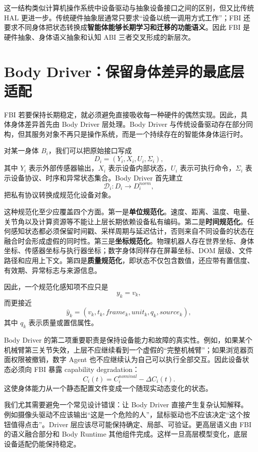 这一结构类似计算机操作系统中设备驱动与抽象设备接口之间的区别，但又比传统 HAL 更进一步。传统硬件抽象层通常只要求“设备以统一调用方式工作”；FBI 还要求不同身体把状态转换成\textbf{智能体能够长期学习和迁移的功能语义}。因此 FBI 是硬件抽象、身体语义抽象和认知 ABI 三者交叉形成的新层次。


\section{Body Driver：保留身体差异的最底层适配}

FBI 若要保持长期稳定，就必须避免直接吸收每一种硬件的偶然实现。因此，具体身体差异首先由 Body Driver 层处理。Body Driver 与传统设备驱动存在部分同构，但其服务对象不再只是操作系统，而是一个持续存在的智能体身体运行时。

对某一身体 \(B_i\)，我们可以把原始接口写成
\[
D_i
=
(
Y_i,
X_i,
U_i,
\Sigma_i
),
\]
其中 \(Y_i\) 表示外部传感器输出，\(X_i\) 表示设备内部状态，\(U_i\) 表示可执行命令，\(\Sigma_i\) 表示设备协议、时序和异常状态集合。Body Driver 首先建立
\[
\mathcal D_i:
D_i
\rightarrow
D_i^{norm},
\]
把私有协议转换成规范化设备对象。

这种规范化至少应覆盖四个方面。第一是\textbf{单位规范化}。速度、距离、温度、电量、关节角以及计算资源等不能让上层长期依赖设备私有编码。第二是\textbf{时间规范化}。任何感知状态都必须保留时间戳、采样周期与延迟估计，否则来自不同设备的状态在融合时会形成虚假的同时性。第三是\textbf{坐标规范化}。物理机器人存在世界坐标、身体坐标、传感器坐标与执行器坐标；数字身体同样存在屏幕坐标、DOM 层级、文件路径和应用上下文。第四是\textbf{质量规范化}，即状态不仅包含数值，还应带有置信度、有效期、异常标志与来源信息。

因此，一个规范化感知项不应只是
\[
y_k=v_k,
\]
而更接近
\[
\hat y_k
=
(
v_k,
t_k,
frame_k,
unit_k,
q_k,
source_k
),
\]
其中 \(q_k\) 表示质量或置信属性。

Body Driver 的第二项重要职责是保持设备能力和故障的真实性。例如，如果某个机械臂第三关节失效，上层不应继续看到一个虚假的“完整机械臂”；如果浏览器页面权限被撤销，数字 Agent 也不应继续认为自己可以执行全部交互。因此设备状态必须向 FBI 暴露 capability degradation：
\[
C_i(t)
=
C_i^{nominal}
-
\Delta C_i(t).
\]
这使身体能力从一个静态配置文件变成一个随现实动态变化的状态。

我们尤其需要避免一个常见设计错误：让 Body Driver 直接产生复杂认知解释。例如摄像头驱动不应该输出“这是一个危险的人”，鼠标驱动也不应该决定“这个按钮值得点击”。Driver 层应该尽可能保持确定、局部、可验证。更高层语义由 FBI 的语义融合部分和 Body Runtime 其他组件完成。这样一旦高层模型变化，底层设备适配仍能保持稳定。

